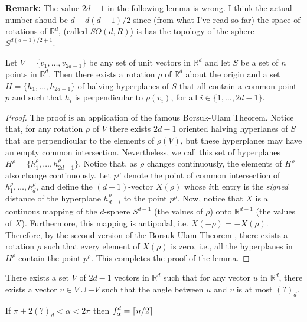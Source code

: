 \documentclass[lotsofwhite]{patmorin}
\newcommand{\crap}[1]{(?)_d}
\begin{document}
\noindent\textbf{Remark:} The value $2d-1$ in the following lemma is
wrong.  I think the actual number shoud be $d+ d(d-1)/2$ since
(from what I've read so far) the space of rotations of $\mathbb{R}^d$,
(called $SO(d,R)$) is has the topology of the sphere $S^{d(d-1)/2+1}$.


\begin{lem}
Let $V=\{v_1,\ldots,v_{2d-1}\}$ be any set of unit vectors in
$\mathbb{R}^d$ and let $S$ be a set of $n$ points in $\mathbb{R}^d$.
Then there exists a rotation $\rho$ of $\mathbb{R}^d$ about the origin and
a set $H=\{h_1,\ldots,h_{2d-1}\}$ of halving hyperplanes of $S$ that
all contain a common point $p$ and such that $h_i$ is perpendicular
to $\rho(v_i)$, for all $i\in \{1,\ldots,2d-1\}$.  
\end{lem}

\begin{proof}
The proof is an application of the famous Borsuk-Ulam Theorem.
Notice that, for any rotation $\rho$ of $V$ there exists $2d-1$
oriented halving hyperlanes of $S$ that are perpendicular to the elements of
$\rho(V)$, but these hyperplanes may have an empty common
intersection.
Nevertheless, we
call this set of hyperplanes $H^\rho=\{h^\rho_1,\ldots,h^\rho_{2d-1}\}$.
Notice that, as $\rho$ changes continuously, the elements of $H^\rho$
also change continuously.  Let $p^\rho$ denote the point of common
intersection of $h^\rho_1,\ldots,h^\rho_d$, and define the $(d-1)$-vector
$X(\rho)$ whose $i$th entry is the \emph{signed} distance of the hyperplane
$h^\rho_{d+i}$ to the point $p^\rho$.  Now, notice that $X$ is a
continous
mapping of the $d$-sphere $S^{d-1}$ (the values of $\rho$) onto
$\mathbb{R}^{d-1}$ (the values of $X$).  Furthermore, this mapping
is antipodal, i.e. $X(-\rho) = -X(\rho)$.  Therefore, by the second
version of the Borsuk-Ulam Theorem \cite[Theorem~2.1.1, version
BU1b]{m03}, there exists a rotation $\rho$ such that every element of
$X(\rho)$ is zero, i.e., all the hyperplanes in $H^\rho$ contain the
point $p^\rho$.  This completes the proof of the lemma.
\end{proof}

\begin{lem}
There exists a set $V$ of $2d-1$ vectors in
$\mathbb{R}^d$ such that for any vector $u$ in $\mathbb{R}^d$, there
exists a vector $v\in V\cup -V$ such that the angle between $u$ and $v$ is at
most $\crap{d}$.
\end{lem}


\begin{lem}
If $\pi+2\crap{d} < \alpha < 2\pi$ then $f^d_\alpha = \left\lceil n/2 \right\rceil$
\end{lem}
\end{document}
